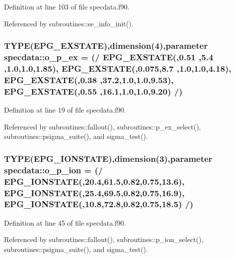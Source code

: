 Definition at line 103 of file specdata.f90.

Referenced by subroutines::se\_\-info\_\-init().\hypertarget{namespacespecdata_ae83fc5fae3d6873e5453849a6289952f}{
\subsubsection[{o\_\-p\_\-ex}]{\setlength{\rightskip}{0pt plus 5cm}TYPE(EPG\_\-EXSTATE),dimension(4),parameter {\bf specdata::o\_\-p\_\-ex} = (/ EPG\_\-EXSTATE(,0.51 ,5.4 ,1.0,1.0,1.85), EPG\_\-EXSTATE(,0.075,8.7 ,1.0,1.0,4.18), EPG\_\-EXSTATE(,0.38 ,37.2,1.0,1.0,9.53), EPG\_\-EXSTATE(,0.55 ,16.1,1.0,1.0,9.20) /)}}
\label{namespacespecdata_ae83fc5fae3d6873e5453849a6289952f}


Definition at line 19 of file specdata.f90.

Referenced by subroutines::fallout(), subroutines::p\_\-ex\_\-select(), subroutines::psigma\_\-suite(), and sigma\_\-test().\hypertarget{namespacespecdata_a67659f2839588aff464762d181bccdd7}{
\subsubsection[{o\_\-p\_\-ion}]{\setlength{\rightskip}{0pt plus 5cm}TYPE(EPG\_\-IONSTATE),dimension(3),parameter {\bf specdata::o\_\-p\_\-ion} = (/ EPG\_\-IONSTATE(,20.4,61.5,0.82,0.75,13.6), EPG\_\-IONSTATE(,25.4,69.5,0.82,0.75,16.9), EPG\_\-IONSTATE(,10.8,72.8,0.82,0.75,18.5) /)}}
\label{namespacespecdata_a67659f2839588aff464762d181bccdd7}


Definition at line 45 of file specdata.f90.

Referenced by subroutines::fallout(), subroutines::p\_\-ion\_\-select(), subroutines::psigma\_\-suite(), and sigma\_\-test().
